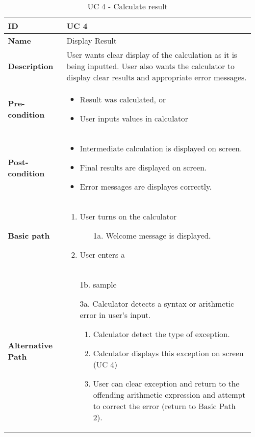 \documentclass{article}
\begin{document}
\begin{table}[!h]
\begin{tabular}{|p{3cm}|p{9cm}|}
\hline
\textbf{ID} & UC 4  \\ \hline
\textbf{Name} & Display Result  \\ \hline
\textbf{Description} & User wants clear display of the calculation as it is being inputted. User also wants the calculator to display clear results and appropriate error messages. \\ \hline
\textbf{Pre-condition} &
	\begin{itemize}
		\vspace{-2mm}
		\item Result was calculated, or
		\item User inputs values in calculator
		\vspace{-3.5mm}
	\end{itemize}  \\ \hline
\textbf{Post-condition} & 
	\begin{itemize}
		\vspace{-2mm}
		\item Intermediate calculation is displayed on screen.
		\item Final results are displayed on screen.
		\item Error messages are displayes correctly.
		\vspace{-3.5mm}
	\end{itemize}  \\ \hline
\textbf{Basic path} &
	\begin{enumerate}
		\vspace{-2mm}
		\item User turns on the calculator
			\begin{itemize}
			\item[1a.] Welcome message is displayed.
			\end{itemize}
		\item User enters a 
		\vspace{-3.5mm}
	\end{enumerate}  \\ \hline
\textbf{Alternative Path} &
	\begin{itemize}[leftmargin=6mm]
		\vspace{-2mm}
		\item [1b.] sample
		\item [3a.] Calculator detects a syntax or arithmetic error in user's input.
			\begin{enumerate}
				\item Calculator detect the type of exception.
				\item Calculator displays this exception on screen (UC 4)
				\item User can clear exception and return to the offending arithmetic expression and attempt to correct the error (return to Basic Path 2).
			\end{enumerate}
		
		\vspace{-3.5mm}
	\end{itemize}  \\ \hline
\end{tabular}
\caption{UC 4 - Calculate result}
\end{table}
\end{document}

